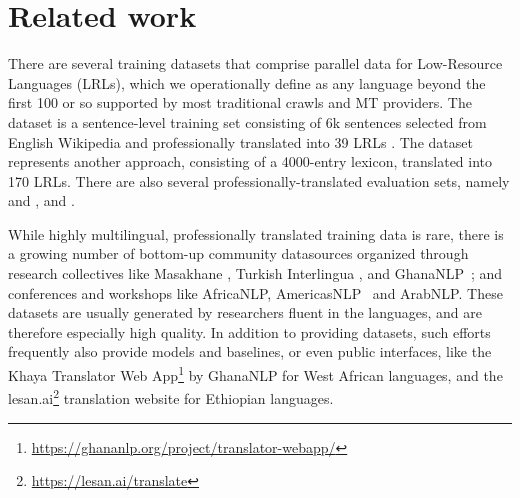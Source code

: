 \section{Related work}
There are several training datasets that comprise parallel data for Low-Resource Languages (LRLs), which we operationally define as any language beyond the first 100 or so supported by most traditional crawls and MT providers. 
The \nllbseed{} dataset is a sentence-level training set consisting of 6k sentences selected from English Wikipedia and professionally translated into 39 LRLs \cite{Nllb2022}.  
The \gatitos{} dataset \cite{Jones2023} represents another approach, consisting of a 4000-entry lexicon, translated into 170 LRLs.
There are also several professionally-translated evaluation sets, namely \floresone{} and \florestwo{} \cite{Goyal2022, Nllb2022}, and \ntrex{} \citep{ntrex}.
 
While highly multilingual, professionally translated training data is rare, 
there is a growing number of bottom-up community datasources organized through research collectives like Masakhane \citep{masakhane}, Turkish Interlingua \citep{mirzakhalov2021large, mirzakhalov2021evaluating}, and GhanaNLP~\citep{ghananlp};
and conferences and workshops like AfricaNLP,
AmericasNLP~\citep{mager-etal-2021-findings} and ArabNLP.
These datasets are usually generated by researchers fluent in the languages, and are therefore especially high quality.
In addition to providing datasets, such efforts frequently also provide models and baselines, or even public interfaces, like the Khaya Translator Web App\footnote{\url{https://ghananlp.org/project/translator-webapp/}} by GhanaNLP for West African languages, and the lesan.ai\footnote{\url{https://lesan.ai/translate}} translation website for Ethiopian languages.

